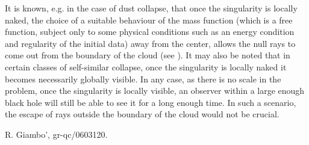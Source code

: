 \documentclass[twocolumn,aps,amsmath,amssymb,prl,showpacs,preprintnumbers]
{revtex4}
\begin{document}
\begin{thebibliography}{99}
 It is known, e.g. in the case of dust collapse,
that once the singularity is locally naked, the choice of a suitable
behaviour of the mass function (which is a free function, subject 
only to some physical conditions such as an energy condition and 
regularity of the initial data) away from the center, allows 
the null rays to come out from the boundary of the cloud (see
\cite{JD}). 
It may also be noted that in certain classes of self-similar 
collapse, once the singularity is locally naked it becomes
necessarily globally visible. In any case, as there is no scale 
in the problem, once the singularity is locally visible, an
observer within a large enough black hole will still be able to
see it for a long enough time. In such a scenario, the escape
of rays outside the boundary of the cloud would not 
be crucial.
 

 R. Giambo', gr-qc/0603120.





\end{thebibliography}
\end{document}

